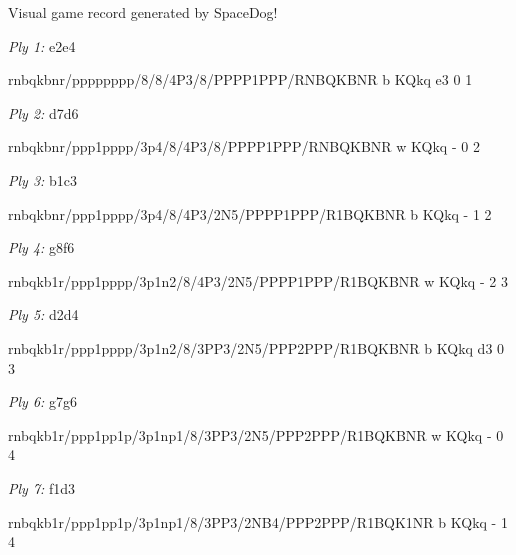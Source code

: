 \documentclass{article}
\begin{document}
{\huge Visual game record generated by SpaceDog!}

\medskip

\newgame

\emph{Ply 1:} e2e4


rnbqkbnr/pppppppp/8/8/4P3/8/PPPP1PPP/RNBQKBNR b KQkq e3 0 1


\showboard

\bigskip

\emph{Ply 2:} d7d6

rnbqkbnr/ppp1pppp/3p4/8/4P3/8/PPPP1PPP/RNBQKBNR w KQkq - 0 2


\showboard

\bigskip

\emph{Ply 3:} b1c3


rnbqkbnr/ppp1pppp/3p4/8/4P3/2N5/PPPP1PPP/R1BQKBNR b KQkq - 1 2


\showboard

\bigskip

\emph{Ply 4:} g8f6

rnbqkb1r/ppp1pppp/3p1n2/8/4P3/2N5/PPPP1PPP/R1BQKBNR w KQkq - 2 3


\showboard

\bigskip

\emph{Ply 5:} d2d4


rnbqkb1r/ppp1pppp/3p1n2/8/3PP3/2N5/PPP2PPP/R1BQKBNR b KQkq d3 0 3


\showboard

\bigskip

\emph{Ply 6:} g7g6

rnbqkb1r/ppp1pp1p/3p1np1/8/3PP3/2N5/PPP2PPP/R1BQKBNR w KQkq - 0 4


\showboard

\bigskip

\emph{Ply 7:} f1d3


rnbqkb1r/ppp1pp1p/3p1np1/8/3PP3/2NB4/PPP2PPP/R1BQK1NR b KQkq - 1 4
\end{document}
